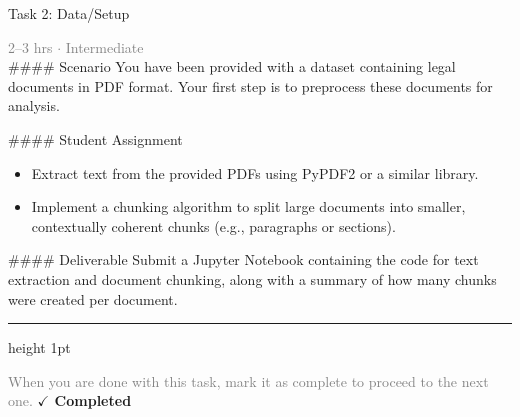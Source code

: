 \documentclass[10pt,a4paper]{article}
\begin{document}
\begin{taskbox}{Task 2: Data/Setup}

    {\small \textcolor{gray}{2--3 hrs $\cdot$ Intermediate}}\\[12pt]

    \#\#\#\# Scenario  
You have been provided with a dataset containing legal documents in PDF format. Your first step is to preprocess these documents for analysis.  

\#\#\#\# Student Assignment  
\begin{itemize}
    \item Extract text from the provided PDFs using PyPDF2 or a similar library.  
    \item Implement a chunking algorithm to split large documents into smaller, contextually coherent chunks (e.g., paragraphs or sections).  
\end{itemize}

\#\#\#\# Deliverable  
Submit a Jupyter Notebook containing the code for text extraction and document chunking, along with a summary of how many chunks were created per document.\par

    \vspace{16pt}

    \textcolor{cardBorder}{\hrule height 1pt}\vspace{8pt}

    \small \textcolor{gray}{When you are done with this task, mark it as complete to proceed to the next one.} \hfill \textbf{\textcolor{brandDark}{$\checkmark$ Completed}}

\end{taskbox}
\end{document}
